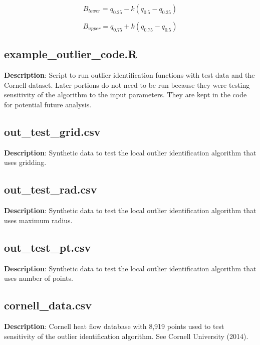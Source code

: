\documentclass[12pt,a4paper]{article}
\begin{document}
\begin{equation} \label{lb}
B_{lower} = q_{0.25} - k(q_{0.5} - q_{0.25})
\end{equation}

\begin{equation} \label{ub}
B_{upper} = q_{0.75} + k(q_{0.75} - q_{0.5})
\end{equation}

\subsection*{\textsf{example\_outlier\_code.R}}

\textbf{Description}: Script to run outlier identification functions with test data and the Cornell dataset. Later portions do not need to be run because they were testing sensitivity of the algorithm to the input parameters. They are kept in the code for potential future analysis.

\subsection*{\textsf{out\_test\_grid.csv}}

\textbf{Description}: Synthetic data to test the local outlier identification algorithm that uses gridding.

\subsection*{\textsf{out\_test\_rad.csv}}

\textbf{Description}: Synthetic data to test the local outlier identification algorithm that uses maximum radius.

\subsection*{\textsf{out\_test\_pt.csv}}

\textbf{Description}: Synthetic data to test the local outlier identification algorithm that uses number of points.

\subsection*{\textsf{cornell\_data.csv}}

\textbf{Description}: Cornell heat flow database with 8,919 points used to test sensitivity of the outlier identification algorithm. See Cornell University (2014).
\end{document}
